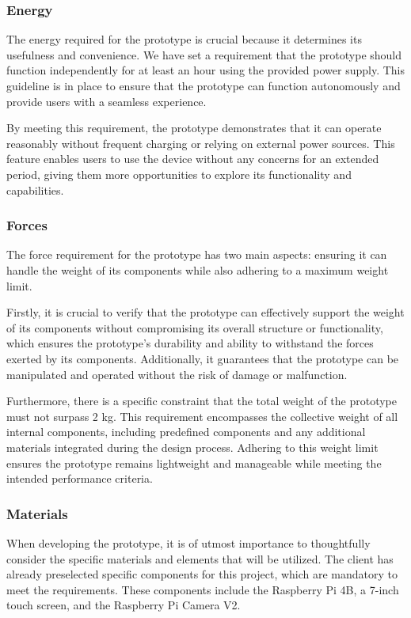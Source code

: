 \subsubsection{Energy}
The energy required for the prototype is crucial because it determines its usefulness and convenience. We have set a requirement that the prototype should function independently for at least an hour using the provided power supply. This guideline is in place to ensure that the prototype can function autonomously and provide users with a seamless experience.

By meeting this requirement, the prototype demonstrates that it can operate reasonably without frequent charging or relying on external power sources. This feature enables users to use the device without any concerns for an extended period, giving them more opportunities to explore its functionality and capabilities.

\subsubsection{Forces}
The force requirement for the prototype has two main aspects: ensuring it can handle the weight of its components while also adhering to a maximum weight limit.

Firstly, it is crucial to verify that the prototype can effectively support the weight of its components without compromising its overall structure or functionality, which ensures the prototype's durability and ability to withstand the forces exerted by its components. Additionally, it guarantees that the prototype can be manipulated and operated without the risk of damage or malfunction.

Furthermore, there is a specific constraint that the total weight of the prototype must not surpass 2 kg. This requirement encompasses the collective weight of all internal components, including predefined components and any additional materials integrated during the design process. Adhering to this weight limit ensures the prototype remains lightweight and manageable while meeting the intended performance criteria.

\subsubsection{Materials}
When developing the prototype, it is of utmost importance to thoughtfully consider the specific materials and elements that will be utilized. The client has already preselected specific components for this project, which are mandatory to meet the requirements. These components include the Raspberry Pi 4B, a 7-inch touch screen, and the Raspberry Pi Camera V2.

